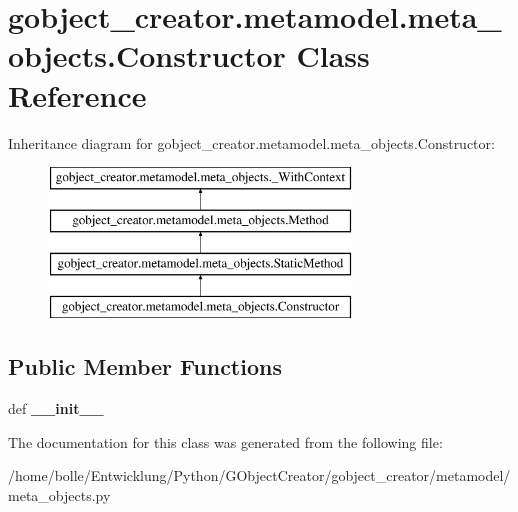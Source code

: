 \hypertarget{classgobject__creator_1_1metamodel_1_1meta__objects_1_1Constructor}{
\section{gobject\_\-creator.metamodel.meta\_\-objects.Constructor Class Reference}
\label{classgobject__creator_1_1metamodel_1_1meta__objects_1_1Constructor}
}
Inheritance diagram for gobject\_\-creator.metamodel.meta\_\-objects.Constructor:\begin{figure}[H]
\begin{center}
\leavevmode
\includegraphics[height=4cm]{classgobject__creator_1_1metamodel_1_1meta__objects_1_1Constructor}
\end{center}
\end{figure}
\subsection*{Public Member Functions}
\begin{DoxyCompactItemize}
\item 
\hypertarget{classgobject__creator_1_1metamodel_1_1meta__objects_1_1Constructor_a13037865ec09398f474f4343ce60f370}{
def {\bfseries \_\-\_\-init\_\-\_\-}}
\label{classgobject__creator_1_1metamodel_1_1meta__objects_1_1Constructor_a13037865ec09398f474f4343ce60f370}

\end{DoxyCompactItemize}


The documentation for this class was generated from the following file:\begin{DoxyCompactItemize}
\item 
/home/bolle/Entwicklung/Python/GObjectCreator/gobject\_\-creator/metamodel/meta\_\-objects.py\end{DoxyCompactItemize}
